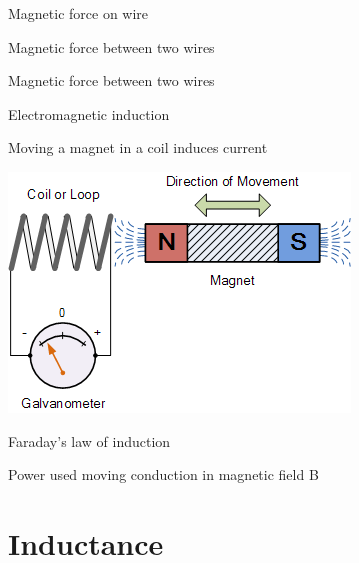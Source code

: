\documentclass[compress]{beamer}
\begin{document}
{
    \begin{frame}{Magnetic force on wire}
    \end{frame}
}

{
    \begin{frame}{Magnetic force between two wires}
    \end{frame}
}

{
    \begin{frame}{Magnetic force between two wires}
    \end{frame}
}

\begin{frame}{Electromagnetic induction}

  Moving a magnet in a coil induces current


    \begin{center}
        \includegraphics[width=0.6\linewidth]{../part2/figs/image29}


    \end{center}
\end{frame}

{
    \begin{frame}{Faraday's law of induction}
    \end{frame}
}

{
    \begin{frame}{Power used moving conduction in magnetic field B}
    \end{frame}
}

\section{Inductance}
\end{document}
